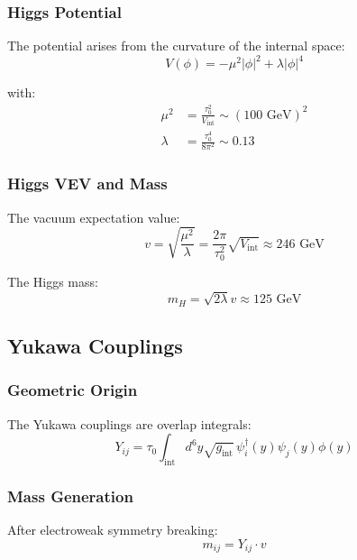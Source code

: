 \subsubsection{Higgs Potential}

The potential arises from the curvature of the internal space:
\begin{equation}
    V(\phi) = -\mu^2|\phi|^2 + \lambda|\phi|^4
\end{equation}

with:
\begin{align}
    \mu^2 &= \frac{\tau_0^2}{V_{\text{int}}} \sim (100 \text{ GeV})^2 \\
    \lambda &= \frac{\tau_0^4}{8\pi^2} \sim 0.13
\end{align}

\subsubsection{Higgs VEV and Mass}

The vacuum expectation value:
\begin{equation}
    v = \sqrt{\frac{\mu^2}{\lambda}} = \frac{2\pi}{\tau_0^2}\sqrt{V_{\text{int}}} \approx 246 \text{ GeV}
\end{equation}

The Higgs mass:
\begin{equation}
    m_H = \sqrt{2\lambda}v \approx 125 \text{ GeV}
\end{equation}

\subsection{Yukawa Couplings}

\subsubsection{Geometric Origin}

The Yukawa couplings are overlap integrals:
\begin{equation}
    Y_{ij} = \tau_0 \int_{\text{int}} d^6y \sqrt{g_{\text{int}}} \, \psi_i^\dagger(y) \psi_j(y) \phi(y)
\end{equation}

\subsubsection{Mass Generation}

After electroweak symmetry breaking:
\begin{equation}
    m_{ij} = Y_{ij} \cdot v
\end{equation}

